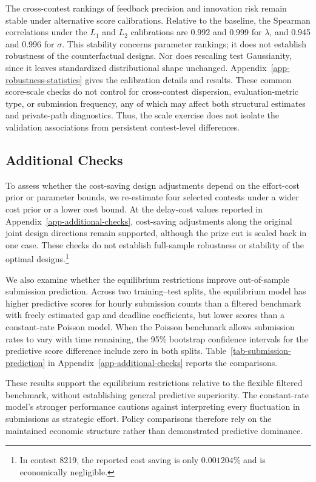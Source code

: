 \documentclass[mnsc]{informs3}
\begin{document}
The cross-contest rankings of feedback precision and innovation risk remain stable under alternative score calibrations. Relative to the baseline, the Spearman correlations under the $L_1$ and $L_2$ calibrations are 0.992 and 0.999 for $\lambda$, and 0.945 and 0.996 for $\sigma$. This stability concerns parameter rankings; it does not establish robustness of the counterfactual designs. Nor does rescaling test Gaussianity, since it leaves standardized distributional shape unchanged. Appendix~\ref{app-robustness-statistics} gives the calibration details and results.
{These common score-scale checks do not control for cross-contest dispersion, evaluation-metric type, or submission frequency, any of which may affect both structural estimates and private-path diagnostics. Thus, the scale exercise does not isolate the validation associations from persistent contest-level differences.}



\subsection{Additional Checks}\label{sect-additional-checks}

To assess whether the cost-saving design adjustments depend on the effort-cost prior or parameter bounds, we re-estimate four selected contests under a wider cost prior or a lower cost bound. At the delay-cost values reported in Appendix~\ref{app-additional-checks}, cost-saving adjustments along the original joint design directions remain supported, although the prize cut is scaled back in one case. These checks do not establish full-sample robustness or stability of the optimal designs.\footnote{In contest 8219, the reported cost saving is only $0.001204\%$ and is economically negligible.}

We also examine whether the equilibrium restrictions improve out-of-sample submission prediction. Across two training--test splits, the equilibrium model has higher predictive scores for hourly submission counts than a filtered benchmark with freely estimated gap and deadline coefficients, but lower scores than a constant-rate Poisson model. When the Poisson benchmark allows submission rates to vary with time remaining, the 95\% bootstrap confidence intervals for the predictive score difference include zero in both splits. Table~\ref{tab-submission-prediction} in Appendix~\ref{app-additional-checks} reports the comparisons.

These results support the equilibrium restrictions relative to the flexible filtered benchmark, without establishing general predictive superiority. The constant-rate model's stronger performance cautions against interpreting every fluctuation in submissions as strategic effort. Policy comparisons therefore rely on the maintained economic structure rather than demonstrated predictive dominance.
\end{document}
